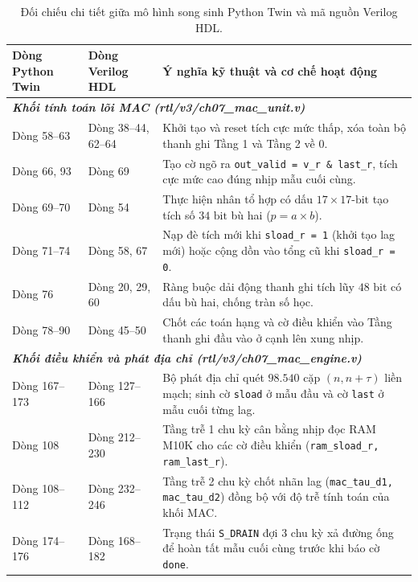 \begin{table}[htbp]
\centering
\small
\caption{Đối chiếu chi tiết giữa mô hình song sinh Python Twin và mã nguồn Verilog HDL.}
\label{tab:ch07_twin_vs_hdl}
\begin{tabularx}{\textwidth}{p{3.0cm} p{3.2cm} X}
\toprule
\textbf{Dòng Python Twin} & \textbf{Dòng Verilog HDL} & \textbf{Ý nghĩa kỹ thuật và cơ chế hoạt động} \\
\midrule
\multicolumn{3}{l}{\textit{\textbf{Khối tính toán lõi MAC (rtl/v3/ch07\_mac\_unit.v)}}} \\
\addlinespace[2pt]
Dòng 58--63 & Dòng 38--44, 62--64 & Khởi tạo và reset tích cực mức thấp, xóa toàn bộ thanh ghi Tầng 1 và Tầng 2 về 0. \\
\addlinespace[3pt]
Dòng 66, 93 & Dòng 69 & Tạo cờ ngõ ra \texttt{out\_valid = v\_r \& last\_r}, tích cực mức cao đúng nhịp mẫu cuối cùng. \\
\addlinespace[3pt]
Dòng 69--70 & Dòng 54 & Thực hiện nhân tổ hợp có dấu $17 \times 17\text{-bit}$ tạo tích số $34\text{ bit}$ bù hai ($p = a \times b$). \\
\addlinespace[3pt]
Dòng 71--74 & Dòng 58, 67 & Nạp đè tích mới khi \texttt{sload\_r = 1} (khởi tạo lag mới) hoặc cộng dồn vào tổng cũ khi \texttt{sload\_r = 0}. \\
\addlinespace[3pt]
Dòng 76 & Dòng 20, 29, 60 & Ràng buộc dải động thanh ghi tích lũy $48\text{ bit}$ có dấu bù hai, chống tràn số học. \\
\addlinespace[3pt]
Dòng 78--90 & Dòng 45--50 & Chốt các toán hạng và cờ điều khiển vào Tầng thanh ghi đầu vào ở cạnh lên xung nhịp. \\
\midrule
\multicolumn{3}{l}{\textit{\textbf{Khối điều khiển và phát địa chỉ (rtl/v3/ch07\_mac\_engine.v)}}} \\
\addlinespace[2pt]
Dòng 167--173 & Dòng 127--166 & Bộ phát địa chỉ quét $98.540$ cặp $(n, n+\tau)$ liền mạch; sinh cờ \texttt{sload} ở mẫu đầu và cờ \texttt{last} ở mẫu cuối từng lag. \\
\addlinespace[3pt]
Dòng 108 & Dòng 212--230 & Tầng trễ 1 chu kỳ cân bằng nhịp đọc RAM M10K cho các cờ điều khiển (\texttt{ram\_sload\_r, ram\_last\_r}). \\
\addlinespace[3pt]
Dòng 108--112 & Dòng 232--246 & Tầng trễ 2 chu kỳ chốt nhãn lag (\texttt{mac\_tau\_d1, mac\_tau\_d2}) đồng bộ với độ trễ tính toán của khối MAC. \\
\addlinespace[3pt]
Dòng 174--176 & Dòng 168--182 & Trạng thái \texttt{S\_DRAIN} đợi 3 chu kỳ xả đường ống để hoàn tất mẫu cuối cùng trước khi báo cờ \texttt{done}. \\
\bottomrule
\end{tabularx}
\end{table}

